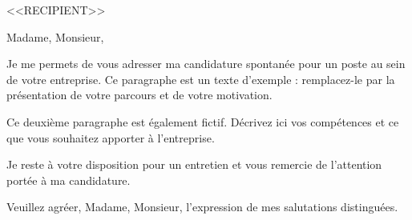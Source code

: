 \documentclass[11pt,a4paper]{letter}
\date{Ville, le <<DATE>>}
\begin{document}
\begin{letter}{<<RECIPIENT>>}

\opening{Madame, Monsieur,}

Je me permets de vous adresser ma candidature spontanée pour un poste au sein
de votre entreprise. Ce paragraphe est un texte d'exemple : remplacez-le par
la présentation de votre parcours et de votre motivation.

Ce deuxième paragraphe est également fictif. Décrivez ici vos compétences et
ce que vous souhaitez apporter à l'entreprise.

Je reste à votre disposition pour un entretien et vous remercie de l'attention
portée à ma candidature.

\closing{Veuillez agréer, Madame, Monsieur, l'expression de mes salutations distinguées.}

\end{letter}
\end{document}
